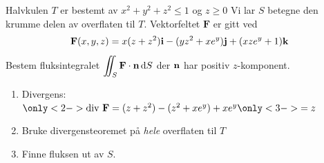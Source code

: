 \begin{frame}
    \begin{example}
        Halvkulen $T$ er bestemt av
        $x^2 + y^2 + z^2 \leq 1$ og $z \geq 0$
        Vi lar $S$ betegne den krumme delen av overflaten til $T$.
        Vektorfeltet $\mathbf{F}$ er gitt ved
        \begin{equation*}
            \mathbf{F}(x,y,z)
            = x(z+z^2)\mathbf{i} - (yz^2 + xe^y)\mathbf{j} + (xze^y + 1)\mathbf{k}
        \end{equation*}
        Bestem fluksintegralet
        $ \displaystyle
        \iint_{S} \mathbf{F} \cdot \mathbf{n} \, \mathrm{d}S
        $
        der $\mathbf{n}$ har positiv $z$-komponent.
      \end{example}
      \begin{enumerate}
        \item Divergens: $ \only<2->{\text{div } \mathbf{F}=(z + z^2)-(z^2 + xe^y)
          + xe^y} \only<3->{=z}$
      \end{enumerate}
      \begin{enumerate}\setcounter{enumi}{1}
        \item Bruke divergensteoremet på \emph{hele} overflaten til $T$
      \end{enumerate}
      \begin{enumerate}\setcounter{enumi}{2}
        \item Finne fluksen ut av $S$.
    \end{enumerate}

\end{frame}

